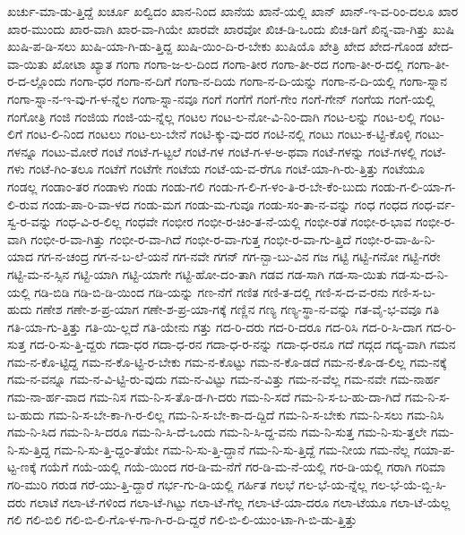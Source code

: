 {ಖರ್ಚು-ಮಾ-ಡು-ತ್ತಿದ್ದೆ
ಖರ್ಚೂ
ಖಲ್ವಿದಂ
ಖಾನ-ನಿಂದ
ಖಾನೆಯ
ಖಾನೆ-ಯಲ್ಲಿ
ಖಾನ್
ಖಾನ್-ಇ-ವ-ರಿಂ-ದಲೂ
ಖಾರ
ಖಾರ-ಮುಂದು
ಖಾರ-ವಾಗಿ
ಖಾರ-ವಾ-ಗಿಯೇ
ಖಾರವೇ
ಖಾರವೋ
ಖಿಚ-ಡಿ-ಒಂದು
ಖಿಚ-ಡಿಗೆ
ಖಿನ್ನ-ವಾ-ಗಿತ್ತು
ಖುಷಿ
ಖುಷಿ-ಪ-ಡಿ-ಸಲು
ಖುಷಿ-ಯಾ-ಗಿ-ಡು-ತ್ತಿದ್ದ
ಖುಷಿ-ಯಿಂ-ದಿ-ರ-ಬೇಕು
ಖುಷಿಯೊ
ಖೇತ್ರಿ
ಖೇದ
ಖೇದ-ಗೊಂಡ
ಖೇದ-ವಾ-ಯಿತು
ಖೋಟಾ
ಖ್ಯಾತ
ಗಂಗಾ
ಗಂಗಾ-ಜ-ಲ-ದಿಂದ
ಗಂಗಾ-ತೀರ
ಗಂಗಾ-ತೀ-ರದ
ಗಂಗಾ-ತೀ-ರ-ದಲ್ಲಿ
ಗಂಗಾ-ತೀ-ರ-ದ-ಲ್ಲೊಂದು
ಗಂಗಾ-ಧರ
ಗಂಗಾ-ನ-ದಿಗೆ
ಗಂಗಾ-ನ-ದಿಯ
ಗಂಗಾ-ನ-ದಿ-ಯನ್ನು
ಗಂಗಾ-ನ-ದಿ-ಯಲ್ಲಿ
ಗಂಗಾ-ಸ್ನಾನ
ಗಂಗಾ-ಸ್ನಾ-ನ-ಇ-ವು-ಗ-ಳ-ನ್ನೆಲ
ಗಂಗಾ-ಸ್ನಾ-ನವೂ
ಗಂಗೆ
ಗಂಗೆಗೆ
ಗಂಗೆ-ಗೇಂ
ಗಂಗೆ-ಗೇನ್
ಗಂಗೆಯ
ಗಂಗೆ-ಯಲ್ಲಿ
ಗಂಗೋತ್ರಿ
ಗಂಜಿ
ಗಂಜಿಯ
ಗಂಜಿ-ಯ-ನ್ನೆಲ್ಲ
ಗಂಟಲ
ಗಂಟ-ಲ-ನೋ-ವಿ-ನಿಂ-ದಾಗಿ
ಗಂಟ-ಲನ್ನು
ಗಂಟ-ಲಲ್ಲಿ
ಗಂಟ-ಲಿಗೆ
ಗಂಟ-ಲಿ-ನಿಂದ
ಗಂಟಲು
ಗಂಟ-ಲು-ಬೇನೆ
ಗಂಟಿ-ಕ್ಕು-ವು-ದರ
ಗಂಟಿ-ನಲ್ಲಿ
ಗಂಟು
ಗಂಟು-ಕ-ಟ್ಟಿ-ಕೊಳ್ಳಿ
ಗಂಟು-ಗಳನ್ನೂ
ಗಂಟು-ಮೋರೆ
ಗಂಟೆ
ಗಂಟೆ-ಗ-ಟ್ಟಲೆ
ಗಂಟೆ-ಗಳ
ಗಂಟೆ-ಗ-ಳ-ಅ-ಥವಾ
ಗಂಟೆ-ಗಳನ್ನು
ಗಂಟೆ-ಗಳಲ್ಲಿ
ಗಂಟೆ-ಗಳು
ಗಂಟೆ-ಗಿಂ-ತಲೂ
ಗಂಟೆಗೆ
ಗಂಟೆಗೇ
ಗಂಟೆಯ
ಗಂಟೆ-ಯ-ವ-ರೆಗೂ
ಗಂಟೆ-ಯಾ-ಗಿ-ರು-ತ್ತಿತ್ತು
ಗಂಟೆಯೂ
ಗಂಡಲ್ಲ
ಗಂಡಾಂ-ತರ
ಗಂಡಾಳು
ಗಂಡು
ಗಂಡು-ಗಲಿ
ಗಂಡು-ಗ-ಲಿ-ಗ-ಳಂ-ತಿ-ರ-ಬೇ-ಕೆಂ-ಬುದು
ಗಂಡು-ಗ-ಲಿ-ಯಾ-ಗ-ಲಿ-ರುವ
ಗಂಡು-ಪಾ-ರಿ-ವಾ-ಳದ
ಗಂಡು-ಮಗ
ಗಂಡು-ಮ-ಗುವೂ
ಗಂಡು-ಸಂ-ತಾ-ನ-ವನ್ನು
ಗಂಧ
ಗಂಧದ
ಗಂಧ-ರ್ವ-ಸ್ವ-ರ-ವನ್ನು
ಗಂಧ-ವಿ-ರ-ಲಿಲ್ಲ
ಗಂಧವೇ
ಗಂಭೀರ
ಗಂಭೀ-ರ-ಚಿಂ-ತ-ನೆ-ಯಲ್ಲಿ
ಗಂಭೀ-ರತೆ
ಗಂಭೀ-ರ-ಭಾವ
ಗಂಭೀ-ರ-ವಾಗಿ
ಗಂಭೀ-ರ-ವಾ-ಗಿತ್ತು
ಗಂಭೀ-ರ-ವಾ-ಗಿದೆ
ಗಂಭೀ-ರ-ವಾ-ಗುತ್ತ
ಗಂಭೀ-ರ-ವಾ-ಗು-ತ್ತಿದೆ
ಗಂಭೀ-ರ-ವಾ-ಹಿ-ನಿ-ಯಾದ
ಗಗ-ನ-ಚಂದ್ರ
ಗಗ-ನ-ಬ-ಲೆ-ಯನೆ
ಗಗ-ನವೇ
ಗಗನ್
ಗಗ-ನ್ಬಾ-ಬು-ವಿನ
ಗಜ
ಗಟ್ಟಿ
ಗಟ್ಟಿ-ಗನೋ
ಗಟ್ಟಿ-ಗರೇ
ಗಟ್ಟಿ-ಮ-ನ-ಸ್ಸಿನ
ಗಟ್ಟಿ-ಯಾಗಿ
ಗಟ್ಟಿ-ಯಾಗೇ
ಗಟ್ಟಿ-ಹೋ-ದಂ-ತಾಗಿ
ಗಡವ
ಗಡ-ಸಾಗಿ
ಗಡ-ಸಾ-ಯಿತು
ಗಡ-ಸು-ದ-ನಿ-ಯಲ್ಲಿ
ಗಡಿ-ಬಿಡಿ
ಗಡಿ-ಬಿ-ಡಿ-ಯಿಂದ
ಗಡಿ-ಯನ್ನು
ಗಣ-ನೆಗೆ
ಗಣಿತ
ಗಣಿ-ತ-ದಲ್ಲಿ
ಗಣಿ-ಸ-ದ-ವ-ರನು
ಗಣಿ-ಸ-ಬ-ಹುದು
ಗಣೇಶ
ಗಣೇ-ಶ-ಪ್ರ-ಯಾಗ
ಗಣೇ-ಶ-ಪ್ರ-ಯಾ-ಗಕ್ಕೆ
ಗಣ್ಣಿನ
ಗಣ್ಯ
ಗಣ್ಯ-ಸ್ಥಾ-ನ-ವನ್ನು
ಗತ-ವೈ-ಭ-ವವೂ
ಗತಿ
ಗತಿ-ಯಾ-ಗು-ತ್ತಿತ್ತು
ಗತಿ-ಯಿ-ಲ್ಲದೆ
ಗತಿ-ಯೇನು
ಗತ್ತು
ಗದ-ರಿ-ದರು
ಗದ-ರಿ-ದರೂ
ಗದ-ರಿಸಿ
ಗದ-ರಿ-ಸಿ-ದಾಗ
ಗದ-ರಿ-ಸುತ್ತ
ಗದ-ರಿ-ಸು-ತ್ತಿ-ದ್ದರು
ಗದಾ-ಧರ
ಗದಾ-ಧ-ರನ
ಗದಾ-ಧ-ರ-ನನ್ನು
ಗದಾ-ಧ-ರನೂ
ಗದೆ
ಗದ್ಗದ
ಗದ್ಯ-ವಾಗಿ
ಗಮನ
ಗಮ-ನ-ಕೊ-ಟ್ಟಿದ್ದ
ಗಮ-ನ-ಕೊ-ಟ್ಟಿ-ರ-ಬೇಕು
ಗಮ-ನ-ಕೊಟ್ಟು
ಗಮ-ನ-ಕೊ-ಡದೆ
ಗಮ-ನ-ಕೊ-ಡ-ಲಿಲ್ಲ
ಗಮ-ನಕ್ಕೆ
ಗಮ-ನ-ವನ್ನೂ
ಗಮ-ನ-ವಿ-ಟ್ಟಿ-ರು-ವುದು
ಗಮ-ನ-ವಿಟ್ಟು
ಗಮ-ನ-ವಿತ್ತು
ಗಮ-ನ-ವೆಲ್ಲ
ಗಮ-ನವೇ
ಗಮ-ನಾರ್ಹ
ಗಮ-ನಾ-ರ್ಹ-ವಾದ
ಗಮ-ನಿಸ
ಗಮ-ನಿ-ಸ-ತೊ-ಡ-ಗಿ-ದರು
ಗಮ-ನಿ-ಸದೆ
ಗಮ-ನಿ-ಸ-ಬ-ಹು-ದಾ-ಗಿದೆ
ಗಮ-ನಿ-ಸ-ಬ-ಹುದು
ಗಮ-ನಿ-ಸ-ಬೇ-ಕಾ-ಗಿ-ರ-ಲಿಲ್ಲ
ಗಮ-ನಿ-ಸ-ಬೇ-ಕಾ-ದ-ದ್ದಿದೆ
ಗಮ-ನಿ-ಸ-ಬೇಕು
ಗಮ-ನಿ-ಸಲು
ಗಮ-ನಿಸಿ
ಗಮ-ನಿ-ಸಿದ
ಗಮ-ನಿ-ಸಿ-ದರೂ
ಗಮ-ನಿ-ಸಿ-ದೆ-ಒಂದು
ಗಮ-ನಿ-ಸಿ-ದ್ದ-ವನು
ಗಮ-ನಿ-ಸುತ್ತ
ಗಮ-ನಿ-ಸು-ತ್ತಲೇ
ಗಮ-ನಿ-ಸು-ತ್ತಿದ್ದ
ಗಮ-ನಿ-ಸು-ತ್ತಿ-ದ್ದಂ-ತೆಯೇ
ಗಮ-ನಿ-ಸು-ತ್ತಿ-ದ್ದಾನೆ
ಗಮ-ನಿ-ಸು-ತ್ತಿದ್ದೆ
ಗಮ-ನೀಯ
ಗಮ-ನೆಲ್ಲ
ಗಯಾ-ಪ-ಟ್ಟ-ಣಕ್ಕೆ
ಗಯೆಗೆ
ಗಯೆ-ಯಲ್ಲಿ
ಗಯೆ-ಯಿಂದ
ಗರ-ಡಿ-ಮ-ನೆಗೆ
ಗರ-ಡಿ-ಮ-ನೆ-ಯಲ್ಲಿ
ಗರ-ಡಿ-ಯಲ್ಲಿ
ಗರಾಗಿ
ಗರಿಮಾ
ಗರಿ-ಮುರಿ
ಗರುಡ
ಗರೆ-ಯು-ತ್ತಿ-ದ್ದಾರೆ
ಗರ್ಭ-ಗು-ಡಿ-ಯಲ್ಲಿ
ಗರ್ಹಿತ
ಗಲಭೆ
ಗಲ-ಭೆ-ಯ-ನ್ನೆಲ್ಲ
ಗಲ-ಭೆ-ಯೆ-ಬ್ಬಿ-ಸಿ-ದರು
ಗಲಾಟೆ
ಗಲಾ-ಟೆ-ಗಳಿಂದ
ಗಲಾ-ಟೆ-ಗಿಟ್ಟು
ಗಲಾ-ಟೆ-ಗೆಲ್ಲ
ಗಲಾ-ಟೆ-ಯಾ-ದರೂ
ಗಲಾ-ಟೆಯೂ
ಗಲಾ-ಟೆ-ಯೆಲ್ಲ
ಗಲಿ
ಗಲಿ-ಬಿಲಿ
ಗಲಿ-ಬಿ-ಲಿ-ಗೊ-ಳ-ಗಾ-ಗಿ-ರ-ದಿ-ದ್ದರೆ
ಗಲಿ-ಬಿ-ಲಿ-ಯುಂ-ಟಾ-ಗಿ-ಬಿ-ಡು-ತ್ತಿತ್ತು
}
